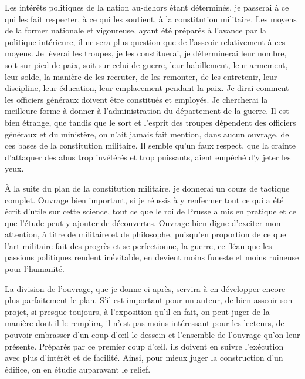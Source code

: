 \documentclass[french,twoside]{book} %
\begin{document}
Les intérêts politiques de la nation au-dehors étant déterminés, je passerai à ce qui les fait respecter, à ce qui les soutient, à la constitution militaire. Les moyens de la former nationale et vigoureuse, ayant été préparés à l’avance par la politique intérieure, il ne sera plus question que de l’asseoir relativement à ces moyens. Je lèverai les troupes, je les constituerai, je déterminerai leur nombre, soit sur pied de paix, soit sur celui de guerre, leur habillement, leur armement, leur solde, la manière de les recruter, de les remonter, de les entretenir, leur discipline, leur éducation, leur emplacement pendant la paix. Je dirai comment les officiers généraux doivent être constitués et employés. Je chercherai la meilleure forme à donner à l’administration du département de la guerre. Il est bien étrange, que tandis que le sort et l’esprit des troupes dépendent des officiers généraux et du ministère, on n’ait jamais fait mention, dans aucun ouvrage, de ces bases de la constitution militaire. Il semble qu’un faux respect, que la crainte d’attaquer des abus trop invétérés et trop puissants, aient empêché d’y jeter les yeux.\par
À la suite du plan de la constitution militaire, je donnerai un cours de tactique complet. Ouvrage bien important, si je réussis à y renfermer tout ce qui a été écrit d’utile sur cette science, tout ce que le roi de Prusse a mis en pratique et ce que l’étude peut y ajouter de découvertes. Ouvrage bien digne d’exciter mon attention, à titre de militaire et de philosophe, puisqu’en proportion de ce que l’art militaire fait des progrès et se perfectionne, la guerre, ce fléau que les passions politiques rendent inévitable, en devient moins funeste et moins ruineuse pour l’humanité.\par
La division de l’ouvrage, que je donne ci-après, servira à en développer encore plus parfaitement le plan. S’il est important pour un auteur, de bien asseoir son projet, si presque toujours, à l’exposition qu’il en fait, on peut juger de la manière dont il le remplira, il n’est pas moins intéressant pour les lecteurs, de pouvoir embrasser d’un coup d’œil le dessein et l’ensemble de l’ouvrage qu’on leur présente. Préparés par ce premier coup d’œil, ils doivent en suivre l’exécution avec plus d’intérêt et de facilité. Ainsi, pour mieux juger la construction d’un édifice, on en étudie auparavant le relief.\par
[…]\par
\end{document}
